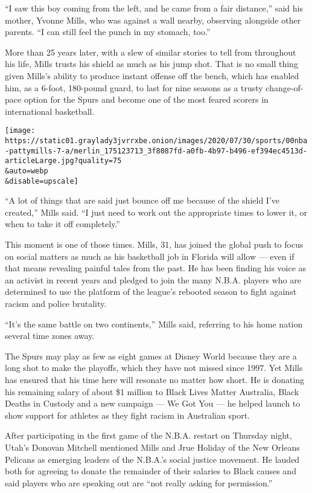 ``I saw this boy coming from the left, and he came from a fair
distance,'' said his mother, Yvonne Mills, who was against a wall
nearby, observing alongside other parents. ``I can still feel the punch
in my stomach, too.''

More than 25 years later, with a slew of similar stories to tell from
throughout his life, Mills trusts his shield as much as his jump shot.
That is no small thing given Mills's ability to produce instant offense
off the bench, which has enabled him, as a 6-foot, 180-pound guard, to
last for nine seasons as a trusty change-of-pace option for the Spurs
and become one of the most feared scorers in international basketball.

\texttt{[image: https://static01.graylady3jvrrxbe.onion/images/2020/07/30/sports/00nba-pattymills-7-a/merlin\_175123713\_3f8087fd-a0fb-4b97-b496-ef394ec4513d-articleLarge.jpg?quality=75\\\&auto=webp\\\&disable=upscale]}

``A lot of things that are said just bounce off me because of the shield
I've created,'' Mills said. ``I just need to work out the appropriate
times to lower it, or when to take it off completely.''

This moment is one of those times. Mills, 31, has joined the global push
to focus on social matters as much as his basketball job in Florida will
allow --- even if that means revealing painful tales from the past. He
has been finding his voice as an activist in recent years and pledged to
join the many N.B.A. players who are determined to use the platform of
the league's rebooted season to fight against racism and police
brutality.

``It's the same battle on two continents,'' Mills said, referring to his
home nation several time zones away.

The Spurs may play as few as eight games at Disney World because they
are a long shot to make the playoffs, which they have not missed since
1997. Yet Mills has ensured that his time here will resonate no matter
how short. He is donating his remaining salary of about \$1 million to
Black Lives Matter Australia, Black Deaths in Custody and a new campaign
--- We Got You --- he helped launch to show support for athletes as they
fight racism in Australian sport.

After participating in the first game of the N.B.A. restart on Thursday
night, Utah's Donovan Mitchell mentioned Mills and Jrue Holiday of the
New Orleans Pelicans as emerging leaders of the N.B.A.'s social justice
movement. He lauded both for agreeing to donate the remainder of their
salaries to Black causes and said players who are speaking out are ``not
really asking for permission.''

